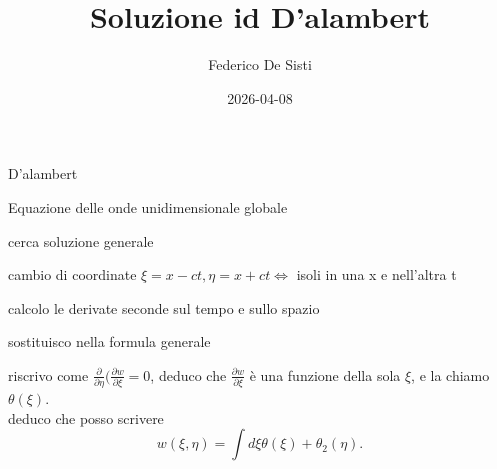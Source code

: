 \documentclass[12px]{article}
\title{Soluzione id D'alambert}
\date{2026-04-08}
\author{Federico De Sisti}
\begin{document}
	\maketitle
	\newpage
	D’alambert

Equazione delle onde unidimensionale globale

cerca soluzione generale

cambio di coordinate $\xi = x - ct, \eta = x + ct \Leftrightarrow$  isoli in una x e nell’altra t

calcolo le derivate seconde sul tempo e sullo spazio

sostituisco nella formula generale

riscrivo come $\frac{\partial}{\partial\eta}(\frac{\partial w}{\partial\xi} = 0$, deduco che
$\frac{\partial w}{\partial\xi}$ è una funzione della sola $\xi$, e la chiamo $\theta(\xi)$.\\

deduco che posso scrivere \[
w(\xi,\eta) = \int d\xi\theta(\xi) + \theta_2(\eta)
.\] 

	
\end{document}
